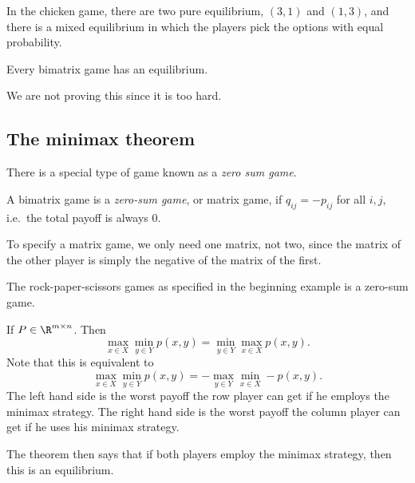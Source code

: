 \documentclass[a4paper]{article}
\begin{document}
\begin{eg}
  In the chicken game, there are two pure equilibrium, $(3, 1)$ and $(1, 3)$, and there is a mixed equilibrium in which the players pick the options with equal probability.
\end{eg}

\begin{thm}[Nash, 1961]
  Every bimatrix game has an equilibrium.
\end{thm}
We are not proving this since it is too hard.

\subsection{The minimax theorem}
There is a special type of game known as a \emph{zero sum game}.
\begin{defi}
  A bimatrix game is a \emph{zero-sum game}, or matrix game, if $q_{ij} = -p_{ij}$ for all $i, j$, i.e.\ the total payoff is always 0.
\end{defi}
To specify a matrix game, we only need one matrix, not two, since the matrix of the other player is simply the negative of the matrix of the first.

\begin{eg}
  The rock-paper-scissors games as specified in the beginning example is a zero-sum game.
\end{eg}

\begin{thm}
  If $P\in \R^{m\times n}$. Then
  \[
    \max_{x\in X}\min_{y\in Y} p(x, y) = \min_{y\in Y}\max_{x\in X} p(x, y).
  \]
  Note that this is equivalent to
  \[
    \max_{x\in X}\min_{y\in Y} p(x, y) = -\max_{y\in Y}\min_{x\in X} -p(x, y).
  \]
  The left hand side is the worst payoff the row player can get if he employs the minimax strategy. The right hand side is the worst payoff the column player can get if he uses his minimax strategy.

  The theorem then says that if both players employ the minimax strategy, then this is an equilibrium.
\end{thm}
\end{document}
